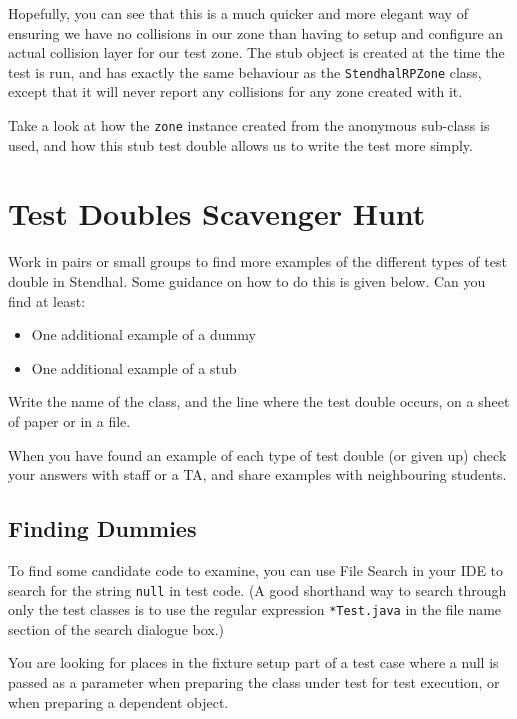 \documentclass[
]{book}
\providecommand{\tightlist}{%
  \setlength{\itemsep}{0pt}\setlength{\parskip}{0pt}}
\begin{document}
Hopefully, you can see that this is a much quicker and more elegant way of ensuring we have no collisions in our zone than having to setup and configure an actual collision layer for our test zone. The stub object is created at the time the test is run, and has exactly the same behaviour as the \texttt{StendhalRPZone} class, except that it will never report any collisions for any zone created with it.

Take a look at how the \texttt{zone} instance created from the anonymous sub-class is used, and how this stub test double allows us to write the test more simply.

\hypertarget{scavenger}{%
\section{Test Doubles Scavenger Hunt}\label{scavenger}}

Work in pairs or small groups to find more examples of the different types of test double in Stendhal. Some guidance on how to do this is given below. Can you find at least:

\begin{itemize}
\tightlist
\item
  One additional example of a dummy
\item
  One additional example of a stub
\end{itemize}

Write the name of the class, and the line where the test double occurs, on a sheet of paper or in a file.

When you have found an example of each type of test double (or given up) check your answers with staff or a TA, and share examples with neighbouring students.

\hypertarget{findum}{%
\subsection{Finding Dummies}\label{findum}}

To find some candidate code to examine, you can use File Search in your IDE to search for the string \texttt{null} in test code. (A good shorthand way to search through only the test classes is to use the regular expression \texttt{*Test.java} in the file name section of the search dialogue box.)

You are looking for places in the fixture setup part of a test case where a null is passed as a parameter when preparing the class under test for test execution, or when preparing a dependent object.
\end{document}
